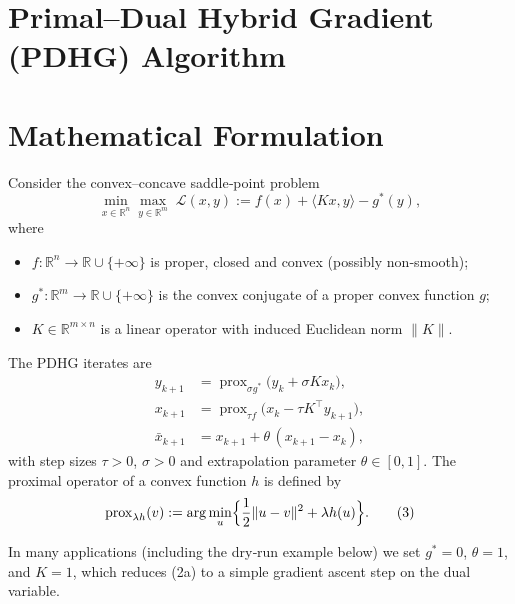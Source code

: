 \documentclass[11pt]{article}
\begin{document}
\section*{Primal–Dual Hybrid Gradient (PDHG) Algorithm}

\section*{Mathematical Formulation}
Consider the convex–concave saddle‑point problem
\[
\min_{x\in\mathbb{R}^n}\max_{y\in\mathbb{R}^m}
\; \mathcal{L}(x,y)
:= f(x)+\langle Kx, y\rangle - g^{*}(y),
\tag{1}
\]
where  

\begin{itemize}
\item $f:\mathbb{R}^{n}\rightarrow\mathbb{R}\cup\{+\infty\}$ is proper, closed and convex (possibly non‑smooth);
\item $g^{*}:\mathbb{R}^{m}\rightarrow\mathbb{R}\cup\{+\infty\}$ is the convex conjugate of a proper convex function $g$;
\item $K\in\mathbb{R}^{m\times n}$ is a linear operator with induced Euclidean norm $\|K\|$.
\end{itemize}

The PDHG iterates are
\[
\boxed{
\begin{aligned}
y_{k+1}&=\operatorname{prox}_{\sigma g^{*}}\!\bigl(y_{k}+\sigma Kx_{k}\bigr), \tag{2a}\\[4pt]
x_{k+1}&=\operatorname{prox}_{\tau f}\!\bigl(x_{k}-\tau K^{\top}y_{k+1}\bigr), \tag{2b}\\[4pt]
\bar{x}_{k+1}&=x_{k+1}+\theta\,(x_{k+1}-x_{k}), \tag{2c}
\end{aligned}}
\]
with step sizes $\tau>0$, $\sigma>0$ and extrapolation parameter $\theta\in[0,1]$.  
The proximal operator of a convex function $h$ is defined by
\[
\operatorname{prox}_{\lambda h}(v):=\arg\min_{u}\Bigl\{\frac12\|u-v\|^{2}+\lambda h(u)\Bigr\}.
\tag{3}
\]

In many applications (including the dry‑run example below) we set $g^{*}=0$, $\theta=1$, and $K=1$, which reduces (2a) to a simple gradient ascent step on the dual variable.
\end{document}
